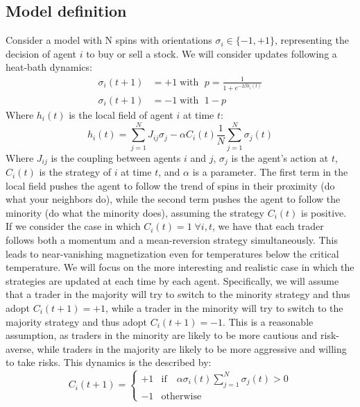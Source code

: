 \subsection{Model definition}
Consider a model with N spins with orientations $\sigma_i\in\{-1,+1\}$, representing the decision of agent $i$ to buy or sell a stock. We will consider updates following a heat-bath dynamics:
\begin{equation}
    \begin{aligned}
        \sigma_i(t+1) &= +1 \;\text{with }\; p = \frac{1}{1+e^{-2\beta h_i(t)}}\\
        \sigma_i(t+1) &= -1 \;\text{with }\; 1-p
    \end{aligned}
    \label{eq:heat_bath}
\end{equation}
Where $h_i(t)$ is the local field of agent $i$ at time $t$:
\begin{equation}
    h_i(t)=\sum_{j=1}^N J_{i j} \sigma_j-\alpha C_i(t) \frac{1}{N} \sum_{j=1}^N \sigma_j(t)
\end{equation}
Where $J_{i j}$ is the coupling between agents $i$ and $j$, $\sigma_j$ is the agent's action at $t$, $C_i(t)$ is the strategy of $i$ at time $t$, and $\alpha$ is a parameter. The first term in the local field pushes the agent to follow the trend of spins in their proximity (do what your neighbors do), while the second term pushes the agent to follow the minority (do what the minority does), assuming the strategy $C_i(t)$ is positive. 
If we consider the case in which $C_i(t) = 1\;\forall i, t$, we have that each trader follows both a momentum and a mean-reversion strategy simultaneously. This leads to near-vanishing magnetization even for temperatures below the critical temperature. 
We will focus on the more interesting and realistic case in which the strategies are updated at each time by each agent. Specifically, we will assume that a trader in the majority will try to switch to the minority strategy and thus adopt $C_i(t+1) = +1$, while a trader in the minority will try to switch to the majority strategy and thus adopt $C_i(t+1) = -1$. This is a reasonable assumption, as traders in the minority are likely to be more cautious and risk-averse, while traders in the majority are likely to be more aggressive and willing to take risks. This dynamics is the described by:
\begin{equation}
    C_i(t+1) = \begin{cases}
        +1 & \text{if} \quad \alpha\sigma_i(t) \sum_{j=1}^N \sigma_j(t)> 0\\
        -1 & \text{otherwise}
    \end{cases}
\end{equation}
